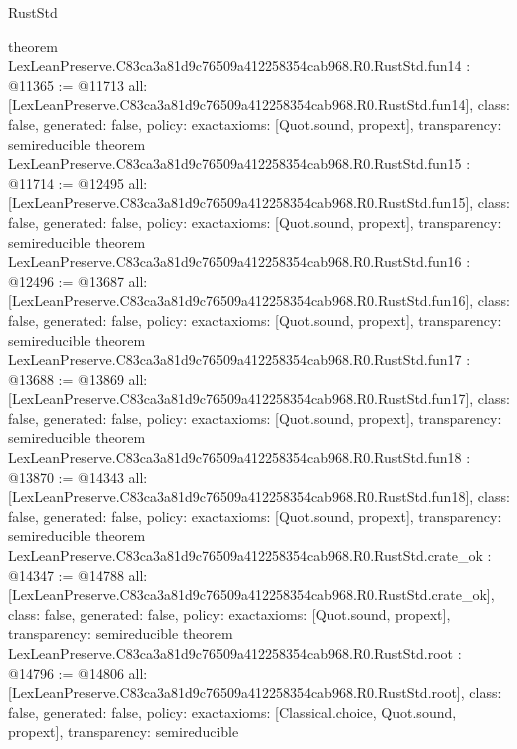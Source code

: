 \begin{lexlean}{RustStd}
\begin{coremodule}
{}
theorem LexLeanPreserve.C83ca3a81d9c76509a412258354cab968.R0.RustStd.fun14 : @11365 := @11713 {
  all: [LexLeanPreserve.C83ca3a81d9c76509a412258354cab968.R0.RustStd.fun14],
  class: false,
  generated: false,
  policy: exact{axioms: [Quot.sound, propext]},
  transparency: semireducible
}
theorem LexLeanPreserve.C83ca3a81d9c76509a412258354cab968.R0.RustStd.fun15 : @11714 := @12495 {
  all: [LexLeanPreserve.C83ca3a81d9c76509a412258354cab968.R0.RustStd.fun15],
  class: false,
  generated: false,
  policy: exact{axioms: [Quot.sound, propext]},
  transparency: semireducible
}
theorem LexLeanPreserve.C83ca3a81d9c76509a412258354cab968.R0.RustStd.fun16 : @12496 := @13687 {
  all: [LexLeanPreserve.C83ca3a81d9c76509a412258354cab968.R0.RustStd.fun16],
  class: false,
  generated: false,
  policy: exact{axioms: [Quot.sound, propext]},
  transparency: semireducible
}
theorem LexLeanPreserve.C83ca3a81d9c76509a412258354cab968.R0.RustStd.fun17 : @13688 := @13869 {
  all: [LexLeanPreserve.C83ca3a81d9c76509a412258354cab968.R0.RustStd.fun17],
  class: false,
  generated: false,
  policy: exact{axioms: [Quot.sound, propext]},
  transparency: semireducible
}
theorem LexLeanPreserve.C83ca3a81d9c76509a412258354cab968.R0.RustStd.fun18 : @13870 := @14343 {
  all: [LexLeanPreserve.C83ca3a81d9c76509a412258354cab968.R0.RustStd.fun18],
  class: false,
  generated: false,
  policy: exact{axioms: [Quot.sound, propext]},
  transparency: semireducible
}
theorem LexLeanPreserve.C83ca3a81d9c76509a412258354cab968.R0.RustStd.crate_ok : @14347 := @14788 {
  all: [LexLeanPreserve.C83ca3a81d9c76509a412258354cab968.R0.RustStd.crate_ok],
  class: false,
  generated: false,
  policy: exact{axioms: [Quot.sound, propext]},
  transparency: semireducible
}
theorem LexLeanPreserve.C83ca3a81d9c76509a412258354cab968.R0.RustStd.root : @14796 := @14806 {
  all: [LexLeanPreserve.C83ca3a81d9c76509a412258354cab968.R0.RustStd.root],
  class: false,
  generated: false,
  policy: exact{axioms: [Classical.choice, Quot.sound, propext]},
  transparency: semireducible
}


\end{coremodule}
\end{lexlean}
